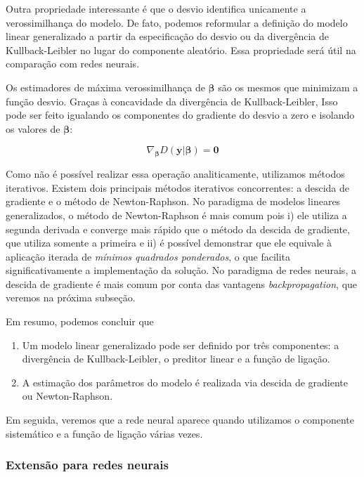 \documentclass[12pt,]{report}
\providecommand{\tightlist}{%
  \setlength{\itemsep}{0pt}\setlength{\parskip}{0pt}}
\begin{document}
Outra propriedade interessante é que o desvio identifica unicamente a verossimilhança do modelo. De fato, podemos reformular a definição do modelo linear generalizado a partir da especificação do desvio ou da divergência de Kullback-Leibler no lugar do componente aleatório. Essa propriedade será útil na comparação com redes neurais.

Os estimadores de máxima verossimilhança de \(\boldsymbol \beta\) são os mesmos que minimizam a função desvio. Graças à concavidade da divergência de Kullback-Leibler, Isso pode ser feito igualando os componentes do gradiente do desvio a zero e isolando os valores de \(\boldsymbol \beta\):

\[
\nabla_{\boldsymbol \beta} D(\mathbf y|{ \boldsymbol \beta}) = \mathbf 0
\]

Como não é possível realizar essa operação analiticamente, utilizamos métodos iterativos. Existem dois principais métodos iterativos concorrentes: a descida de gradiente e o método de Newton-Raphson. No paradigma de modelos lineares generalizados, o método de Newton-Raphson é mais comum pois i) ele utiliza a segunda derivada e converge mais rápido que o método da descida de gradiente, que utiliza somente a primeira e ii) é possível demonstrar que ele equivale à aplicação iterada de \emph{mínimos quadrados ponderados}, o que facilita significativamente a implementação da solução. No paradigma de redes neurais, a descida de gradiente é mais comum por conta das vantagens \emph{backpropagation}, que veremos na próxima subseção.

Em resumo, podemos concluir que

\begin{enumerate}
\def\labelenumi{\arabic{enumi}.}
\tightlist
\item
  Um modelo linear generalizado pode ser definido por três componentes: a divergência de Kullback-Leibler, o preditor linear e a função de ligação.
\item
  A estimação dos parâmetros do modelo é realizada via descida de gradiente ou Newton-Raphson.
\end{enumerate}

Em seguida, veremos que a rede neural aparece quando utilizamos o componente sistemático e a função de ligação várias vezes.

\hypertarget{extensuxe3o-para-redes-neurais}{%
\subsubsection{Extensão para redes neurais}\label{extensuxe3o-para-redes-neurais}}
\end{document}
